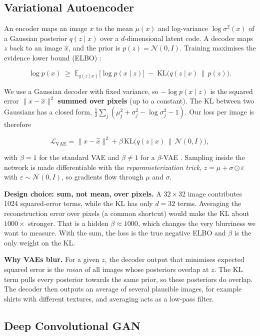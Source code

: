 \documentclass[11pt,letterpaper]{article}
\begin{document}
\subsection{Variational Autoencoder}\label{sec:vae}

An encoder maps an image \(x\) to the mean \(\mu(x)\) and log-variance
\(\log\sigma^2(x)\) of a Gaussian posterior \(q(z\mid x)\) over a
\(d\)-dimensional latent code. A decoder maps \(z\) back to an image
\(\hat x\), and the prior is \(p(z)=\mathcal N(0,I)\). Training
maximises the evidence lower bound (ELBO) \cite{kingma2014}:

\[\log p(x) \;\ge\; \mathbb E_{q(z\mid x)}\big[\log p(x\mid z)\big] \;-\; \mathrm{KL}\big(q(z\mid x)\,\|\,p(z)\big).\]

We use a Gaussian decoder with fixed variance, so \(-\log p(x\mid z)\)
is the squared error \(\|x-\hat x\|^2\) \textbf{summed over pixels} (up
to a constant). The KL between two Gaussians has a closed form,
\(\tfrac12\sum_j(\mu_j^2+\sigma_j^2-\log\sigma_j^2-1)\). Our loss per
image is therefore

\[\mathcal L_\text{VAE} = \|x-\hat x\|^2 + \beta\,\mathrm{KL}\big(q(z\mid x)\,\|\,\mathcal N(0,I)\big),\]

with \(\beta=1\) for the standard VAE and \(\beta\neq1\) for a
\(\beta\)-VAE \cite{higgins2017}. Sampling inside the network is made
differentiable with the \emph{reparameterization trick},
\(z=\mu+\sigma\odot\varepsilon\) with
\(\varepsilon\sim\mathcal N(0,I)\), so gradients flow through \(\mu\)
and \(\sigma\).

\textbf{Design choice: sum, not mean, over pixels.} A \(32 \times 32\)
image contributes 1024 squared-error terms, while the KL has only
\(d=32\) terms. Averaging the reconstruction error over pixels (a common
shortcut) would make the KL about \(1000\times\) stronger. That is a
hidden \(\beta \approx 1000\), which changes the very blurriness we want
to measure. With the sum, the loss is the true negative ELBO and
\(\beta\) is the only weight on the KL.

\textbf{Why VAEs blur.} For a given \(z\), the decoder output that
minimises expected squared error is the \emph{mean} of all images whose
posteriors overlap at \(z\). The KL term pulls every posterior towards
the same prior, so these posteriors do overlap. The decoder then outputs
an average of several plausible images, for example shirts with
different textures, and averaging acts as a low-pass filter.

\subsection{Deep Convolutional GAN}\label{sec:gan}
\end{document}
